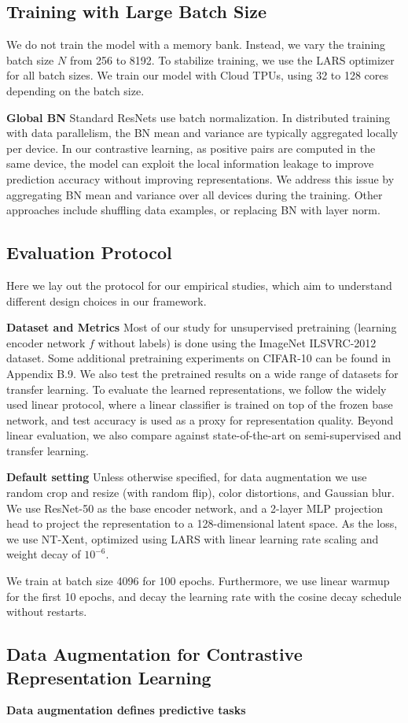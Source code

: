 \documentclass[conference]{IEEEtran}
\begin{document}
\subsection{Training with Large Batch Size}
We do not train the model with a memory bank. Instead, we vary the training batch size $N$ from 256 to 8192. 
To stabilize training, we use the LARS optimizer for all batch sizes. We train our model with Cloud TPUs, using 32 to 128 cores depending on the batch size.

\textbf{Global BN} Standard ResNets use batch normalization. In distributed training with data parallelism, the BN mean and variance are typically aggregated locally per device.
In our contrastive learning, as positive pairs are computed in the same device, the model can exploit the local information leakage to improve prediction accuracy without improving representations.
We address this issue by aggregating BN mean and variance over all devices during the training. Other approaches include shuffling data examples, or replacing BN with layer norm.

\subsection{Evaluation Protocol}
Here we lay out the protocol for our empirical studies, which aim to understand different design choices in our framework.

\textbf{Dataset and Metrics} Most of our study for unsupervised pretraining (learning encoder network $f$ without labels) is done using the ImageNet ILSVRC-2012 dataset.
Some additional pretraining experiments on CIFAR-10 can be found in Appendix B.9. 
We also test the pretrained results on a wide range of datasets for transfer learning. 
To evaluate the learned representations, we follow the widely used linear protocol, where a linear classifier is trained on top of the frozen base network,
and test accuracy is used as a proxy for representation quality. 
Beyond linear evaluation, we also compare against state-of-the-art on semi-supervised and transfer learning.

\textbf{Default setting} Unless otherwise specified, for data augmentation we use random crop and resize (with random flip), color distortions, and Gaussian blur.
We use ResNet-50 as the base encoder network, and a 2-layer MLP projection head to project the representation to a 128-dimensional latent space.
As the loss, we use NT-Xent, optimized using LARS with linear learning rate scaling and weight decay of $10^{-6}$.

We train at batch size 4096 for 100 epochs. Furthermore, we use linear warmup for the first 10 epochs, and decay the learning rate with the cosine decay schedule without restarts.

\subsection{Data Augmentation for Contrastive Representation Learning}
\textbf{Data augmentation defines predictive tasks}


\end{document}
